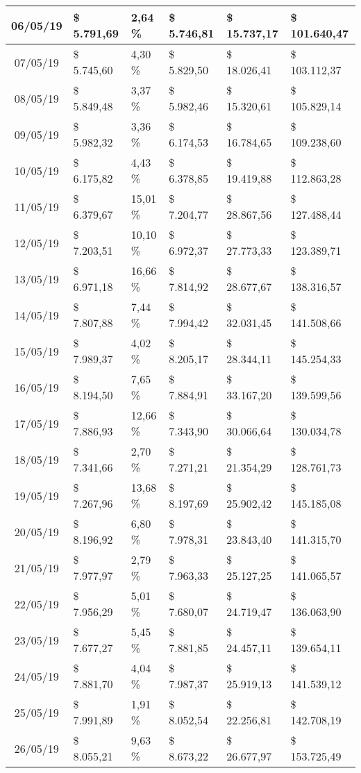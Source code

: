 \begin{small}
\begin{longtable}{|c|l|l|l|l|l|}
06/05/19 & \$ 5.791,69 & 2,64 \% & \$ 5.746,81 & \$ 15.737,17 & \$ 101.640,47 \\ \hline
07/05/19 & \$ 5.745,60 & 4,30 \% & \$ 5.829,50 & \$ 18.026,41 & \$ 103.112,37 \\ \hline
08/05/19 & \$ 5.849,48 & 3,37 \% & \$ 5.982,46 & \$ 15.320,61 & \$ 105.829,14 \\ \hline
09/05/19 & \$ 5.982,32 & 3,36 \% & \$ 6.174,53 & \$ 16.784,65 & \$ 109.238,60 \\ \hline
10/05/19 & \$ 6.175,82 & 4,43 \% & \$ 6.378,85 & \$ 19.419,88 & \$ 112.863,28 \\ \hline
11/05/19 & \$ 6.379,67 & 15,01 \% & \$ 7.204,77 & \$ 28.867,56 & \$ 127.488,44 \\ \hline
12/05/19 & \$ 7.203,51 & 10,10 \% & \$ 6.972,37 & \$ 27.773,33 & \$ 123.389,71 \\ \hline
13/05/19 & \$ 6.971,18 & 16,66 \% & \$ 7.814,92 & \$ 28.677,67 & \$ 138.316,57 \\ \hline
14/05/19 & \$ 7.807,88 & 7,44 \% & \$ 7.994,42 & \$ 32.031,45 & \$ 141.508,66 \\ \hline
15/05/19 & \$ 7.989,37 & 4,02 \% & \$ 8.205,17 & \$ 28.344,11 & \$ 145.254,33 \\ \hline
16/05/19 & \$ 8.194,50 & 7,65 \% & \$ 7.884,91 & \$ 33.167,20 & \$ 139.599,56 \\ \hline
17/05/19 & \$ 7.886,93 & 12,66 \% & \$ 7.343,90 & \$ 30.066,64 & \$ 130.034,78 \\ \hline
18/05/19 & \$ 7.341,66 & 2,70 \% & \$ 7.271,21 & \$ 21.354,29 & \$ 128.761,73 \\ \hline
19/05/19 & \$ 7.267,96 & 13,68 \% & \$ 8.197,69 & \$ 25.902,42 & \$ 145.185,08 \\ \hline
20/05/19 & \$ 8.196,92 & 6,80 \% & \$ 7.978,31 & \$ 23.843,40 & \$ 141.315,70 \\ \hline
21/05/19 & \$ 7.977,97 & 2,79 \% & \$ 7.963,33 & \$ 25.127,25 & \$ 141.065,57 \\ \hline
22/05/19 & \$ 7.956,29 & 5,01 \% & \$ 7.680,07 & \$ 24.719,47 & \$ 136.063,90 \\ \hline
23/05/19 & \$ 7.677,27 & 5,45 \% & \$ 7.881,85 & \$ 24.457,11 & \$ 139.654,11 \\ \hline
24/05/19 & \$ 7.881,70 & 4,04 \% & \$ 7.987,37 & \$ 25.919,13 & \$ 141.539,12 \\ \hline
25/05/19 & \$ 7.991,89 & 1,91 \% & \$ 8.052,54 & \$ 22.256,81 & \$ 142.708,19 \\ \hline
26/05/19 & \$ 8.055,21 & 9,63 \% & \$ 8.673,22 & \$ 26.677,97 & \$ 153.725,49 \\ \hline

\end{longtable}
\end{small}

